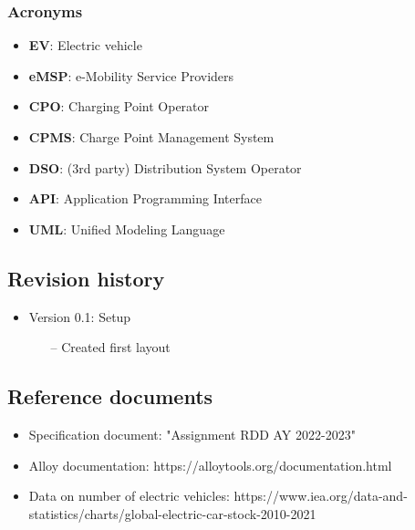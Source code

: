 \documentclass[table, 12pt]{article} %
\begin{document}
    \subsubsection*{Acronyms}
        \begin{itemize}
            \item \textbf{EV}: Electric vehicle
            \item \textbf{eMSP}: e-Mobility Service Providers
            \item \textbf{CPO}: Charging Point Operator
            \item \textbf{CPMS}: Charge Point Management System
            \item \textbf{DSO}: (3rd party) Distribution System Operator
            \item \textbf{API}: Application Programming Interface
            \item \textbf{UML}: Unified Modeling Language
        \end{itemize}

    \newpage
    \subsection{Revision history}
        \begin{itemize}
            \item Version 0.1: Setup
            \begin{itemize}
                \item[--] Created first layout
            \end{itemize}
        \end{itemize}

    \subsection{Reference documents}
        \begin{itemize}
            \item Specification document: "Assignment RDD AY 2022-2023"
            \item Alloy documentation: https://alloytools.org/documentation.html
            \item Data on number of electric vehicles: https://www.iea.org/data-and-statistics/charts/global-electric-car-stock-2010-2021
        \end{itemize}
    
\end{document}
